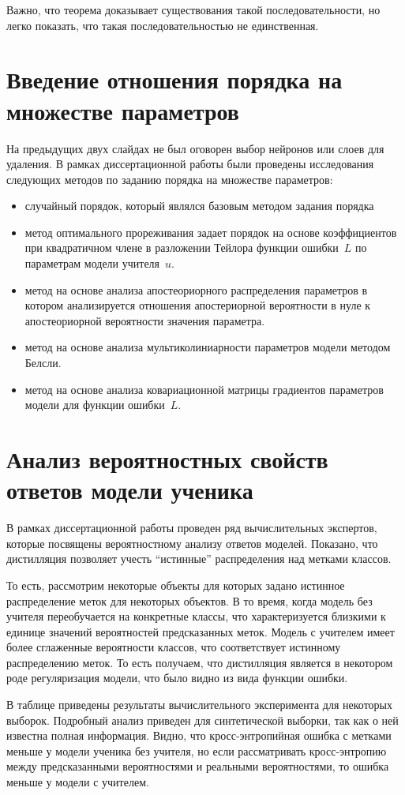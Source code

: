 \documentclass[10pt, twoside]{article}
\begin{document}
Важно, что теорема доказывает существования такой последовательности, но легко показать, что такая последовательностью не единственная.

\section{Введение отношения порядка на множестве параметров}
На предыдущих двух слайдах не был оговорен выбор нейронов или слоев для удаления. В рамках диссертационной работы были проведены исследования следующих методов по заданию порядка на множестве параметров:
\begin{itemize}
    \item случайный порядок, который являлся базовым методом задания порядка
    \item метод оптимального прореживания задает порядок на основе коэффициентов при квадратичном члене в разложении Тейлора функции ошибки~$L$ по параметрам модели учителя~$u$.
    \item метод на основе анализа апостеориорного распределения параметров в котором анализируется отношения апостериорной вероятности в нуле к апостеориорной вероятности значения параметра.
    \item метод на основе анализа мультиколиниарности параметров модели методом Белсли.
    \item метод на основе анализа ковариационной матрицы градиентов параметров модели для функции ошибки~$L$.
\end{itemize}
\section{Анализ вероятностных свойств ответов модели ученика}
В рамках диссертационной работы проведен ряд вычислительных экспертов, которые посвящены вероятностному анализу ответов моделей. Показано, что дистилляция позволяет учесть ``истинные'' распределения над метками классов.

То есть, рассмотрим некоторые объекты для которых задано истинное распределение меток для некоторых объектов. В то время, когда модель без учителя переобучается на конкретные классы, что характеризуется близкими к единице значений вероятностей предсказанных меток. Модель с учителем имеет более сглаженные вероятности классов, что соответствует истинному распределению меток. То есть получаем, что дистилляция является в некотором роде регуляризация модели, что было видно из вида функции ошибки.

В таблице приведены результаты вычислительного эксперимента для некоторых выборок. Подробный анализ приведен для синтетической выборки, так как о ней известна полная информация. Видно, что кросс-энтропийная ошибка с метками меньше у модели ученика без учителя, но если рассматривать кросс-энтропию между предсказанными вероятностями и реальными вероятностями, то ошибка меньше у модели с учителем.
\end{document}
